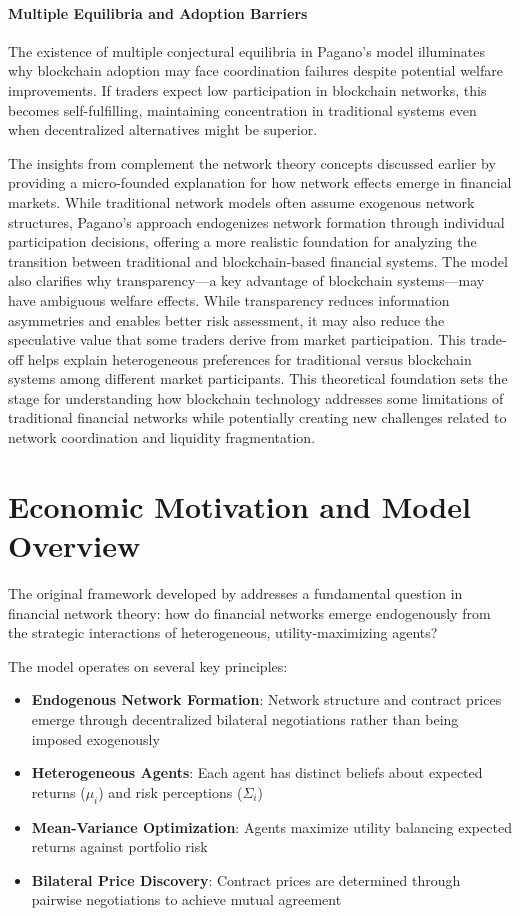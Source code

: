\paragraph{Multiple Equilibria and Adoption Barriers} The existence of multiple conjectural equilibria in Pagano's model illuminates why blockchain adoption may face coordination failures despite potential welfare improvements. If traders expect low participation in blockchain networks, this becomes self-fulfilling, maintaining concentration in traditional systems even when decentralized alternatives might be superior.
 
The insights from  complement the network theory concepts discussed earlier by providing a micro-founded explanation for how network effects emerge in financial markets. While traditional network models often assume exogenous network structures, Pagano's approach endogenizes network formation through individual participation decisions, offering a more realistic foundation for analyzing the transition between traditional and blockchain-based financial systems.
The model also clarifies why transparency—a key advantage of blockchain systems—may have ambiguous welfare effects. While transparency reduces information asymmetries and enables better risk assessment, it may also reduce the speculative value that some traders derive from market participation. This trade-off helps explain heterogeneous preferences for traditional versus blockchain systems among different market participants.
This theoretical foundation sets the stage for understanding how blockchain technology addresses some limitations of traditional financial networks while potentially creating new challenges related to network coordination and liquidity fragmentation.

 \section{Economic Motivation and Model Overview}

The original framework developed by \cite{jalan_incentive-aware_2024} addresses a fundamental question in financial network theory: how do financial networks emerge endogenously from the strategic interactions of heterogeneous, utility-maximizing agents? 

The model operates on several key principles:

\begin{itemize}
   \item \textbf{Endogenous Network Formation}: Network structure and contract prices emerge through decentralized bilateral negotiations rather than being imposed exogenously
   \item \textbf{Heterogeneous Agents}: Each agent has distinct beliefs about expected returns ($\mu_i$) and risk perceptions ($\Sigma_i$)
   \item \textbf{Mean-Variance Optimization}: Agents maximize utility balancing expected returns against portfolio risk
   \item \textbf{Bilateral Price Discovery}: Contract prices are determined through pairwise negotiations to achieve mutual agreement
\end{itemize}

